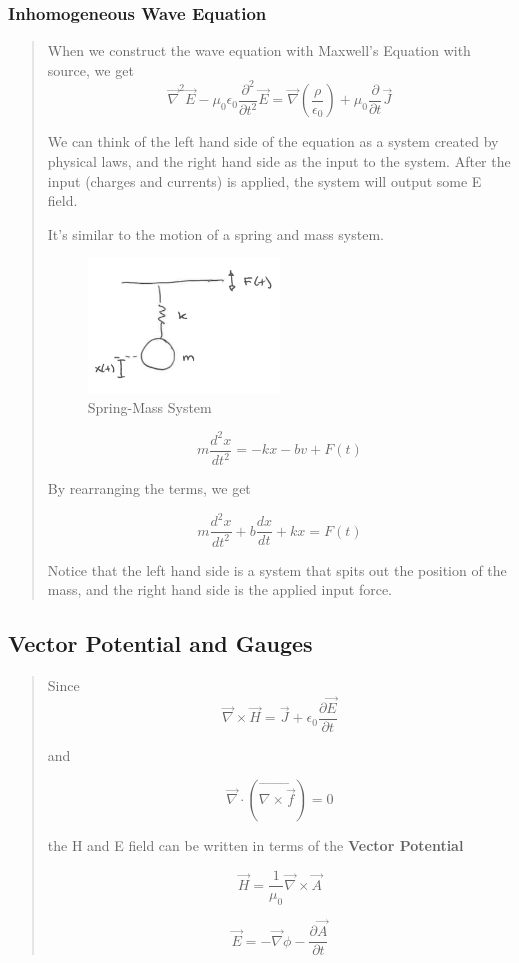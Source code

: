 \documentclass{article} %
\begin{document}
\subsubsection{Inhomogeneous Wave Equation}
\begin{quote}
    When we construct the wave equation with Maxwell's Equation with source, we get
    \[\vec{\nabla}^2\vec{E}-\mu_0\epsilon_0 \frac{\partial ^2}{\partial t^2}\vec{E} = \vec{\nabla}\left(\frac{\rho}{\epsilon_0}\right) + \mu_0 \frac{\partial}{\partial t} \vec{J}\]

    We can think of the left hand side of the equation as a system created by physical laws, and the right hand side as the input to the system. After the input (charges and currents) is applied, the system will output some E field.

    It's similar to the motion of a spring and mass system.

    \begin{figure}[H]
        \centering
        \includegraphics[width=0.5\textwidth]{./image/figure4.png}
        \caption{Spring-Mass System}
    \end{figure}

    \[m \frac{d^2 x}{dt^2} = -kx -bv + F(t)\]

    By rearranging the terms, we get

    \[m \frac{d^2 x}{dt^2} + b\frac{dx}{dt} + kx = F(t)\]

    Notice that the left hand side is a system that spits out the position of the mass, and the right hand side is the applied input force.
\end{quote}

\subsection{Vector Potential and Gauges}
\begin{quote}
    Since
    \[\vec{\nabla} \times \vec{H} = \vec{J} + \epsilon_0 \frac{\partial \vec{E}}{\partial t}\]

    and

    \[\vec{\nabla} \cdot \left(\vec{\nabla \times \vec{f}}\right) = 0\]

    the H and E field can be written in terms of the \textbf{Vector Potential}

    \[\vec{H} = \frac{1}{\mu_0} \vec{\nabla} \times \vec{A} \]

    \[\vec{E} = -\vec{\nabla}\phi - \frac{\partial \vec{A}}{\partial t}\]



\end{quote}
\end{document}
